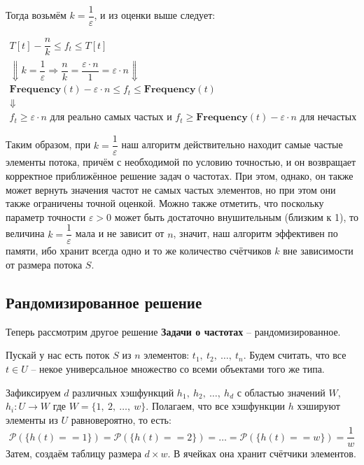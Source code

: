 \documentclass[a4paper,12pt]{article}
\renewcommand{\P}{\mathcal{P}}
\begin{document}
Тогда возьмём $k = \dfrac{1}{\varepsilon}$, и из оценки выше следует:

\begin{gather*}
    T[t] - \dfrac{n}{k} \leqslant f_t \leqslant T[t] \\ \Downarrow k = \dfrac{1}{\varepsilon} \Longrightarrow \dfrac{n}{k} = \dfrac{\varepsilon \cdot n}{1} = \varepsilon\cdot n\Downarrow\\
    \textbf{Frequency}(t) - \varepsilon \cdot n \leqslant f_t \leqslant \textbf{Frequency}(t) \\ \Downarrow\\
    f_t \geqslant \varepsilon\cdot n\text{ для реально самых частых и }f_t \geqslant \textbf{Frequency}(t) - \varepsilon \cdot n \text{ для нечастых}
\end{gather*}

Таким образом, при $k = \dfrac{1}{\varepsilon}$ наш алгоритм действительно находит самые частые элементы потока, причём с необходимой по условию точностью, и он возвращает корректное приближённое решение задач о частотах. При этом, однако, он также может вернуть значения частот не самых частых элементов, но при этом они также ограничены точной оценкой. Можно также отметить, что поскольку параметр точности $\varepsilon > 0$ может быть достаточно внушительным (близким к 1),  то величина $k = \dfrac{1}{\varepsilon}$ мала и не зависит от $n$, значит, наш алгоритм эффективен по памяти, ибо хранит всегда одно и то же количество счётчиков $k$ вне зависимости от размера потока $S$.

\subsection{Рандомизированное решение}

Теперь рассмотрим другое решение \textbf{Задачи о частотах} -- рандомизированное.

Пускай у нас есть поток $S$ из $n$ элементов: $t_1,\ t_2,\ \ldots,\ t_n$. Будем считать, что все $t \in U$ -- некое универсальное множество со всеми объектами того же типа. 

Зафиксируем $d$ различных хэшфункций $h_1,\ h_2,\ \ldots,\ h_d$ с областью значений $W$, $h_i : U \to W$ где $W = \{1,\ 2,\ \ldots,\ w\}$. Полагаем, что все хэшфункции $h$ хэшируют элементы из $U$ равновероятно, то есть:
\[\P(\{h(t) == 1\}) = \P(\{h(t) == 2\}) = \ldots = \P(\{h(t) == w\}) = \dfrac{1}{w}\] Затем, создаём таблицу размера $d \times w$. В ячейках она хранит счётчики элементов.
\end{document}
